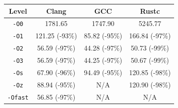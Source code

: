 \begin{tabular*}{\columnwidth}{@{\extracolsep\fill}cccc@{\extracolsep\fill}}
\toprule
\textbf{Level} & \textbf{Clang} & \textbf{GCC} & \textbf{Rustc} \\
\midrule
\texttt{-O0} & 1781.65 & 1747.90 & 5245.77 \\
\texttt{-O1} & 121.25 (-93\%) & 85.82 (-95\%) & 166.84 (-97\%) \\
\texttt{-O2} & 56.59 (-97\%) & 44.28 (-97\%) & 50.73 (-99\%) \\
\texttt{-O3} & 56.59 (-97\%) & 44.25 (-97\%) & 50.67 (-99\%) \\
\texttt{-Os} & 67.90 (-96\%) & 94.49 (-95\%) & 120.85 (-98\%) \\
\texttt{-Oz} & 88.94 (-95\%) & N/A & 120.90 (-98\%) \\
\texttt{-Ofast} & 56.85 (-97\%) & N/A & N/A \\
\bottomrule
\end{tabular*}
